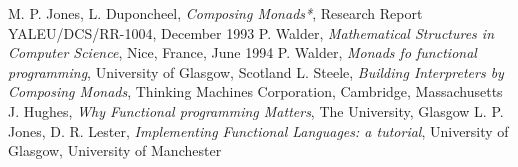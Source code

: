 \begin{thebibliography}{99}
   M. P. Jones, L. Duponcheel, \emph{Composing Monads*}, Research Report YALEU/DCS/RR-1004, December 1993
   P. Walder, \emph{Mathematical Structures in Computer Science}, Nice, France, June 1994
   P. Walder, \emph{Monads fo functional programming}, University of Glasgow, Scotland
   L. Steele, \emph{Building Interpreters by Composing Monads}, Thinking Machines Corporation, Cambridge, Massachusetts
   J. Hughes, \emph{Why Functional programming Matters}, The University, Glasgow
   L. P. Jones, D. R. Lester, \emph{Implementing Functional Languages: a tutorial}, University of Glasgow, University of Manchester
\end{thebibliography}